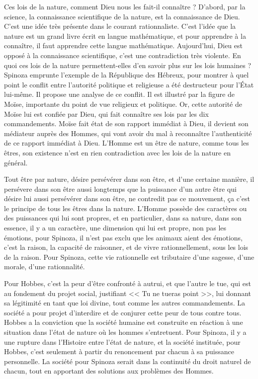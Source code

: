 \documentclass[11pt]{article}
\begin{document}
Ces lois de la nature, comment Dieu nous les fait-il connaître ? D'abord, par la science, la connaissance scientifique de la nature, est la connaissance de Dieu. C'est une idée très présente dans le courant rationnaliste. C'est l'idée que la nature est un grand livre écrit en langue mathématique, et pour apprendre à la connaître, il faut apprendre cette langue mathématique. Aujourd'hui, Dieu est opposé à la connaissance scientifique, c'est une contradiction très violente. En quoi ces lois de la nature permettent-elles d'en savoir plus sur les lois humaines ? Spinoza emprunte l'exemple de la République des Hébreux, pour montrer à quel point le conflit entre l'autorité politique et religieuse a été destructeur pour l'État lui-même. Il propose une analyse de ce conflit. Il est illustré par la figure de Moïse, importante du point de vue religieux et politique. Or, cette autorité de Moïse lui est confiée par Dieu, qui fait connaître ses lois par les dix commandements. Moïse fait état de son rapport immédiat à Dieu, il devient son médiateur auprès des Hommes, qui vont avoir du mal à reconnaître l'authenticité de ce rapport immédiat à Dieu. L'Homme est un être de nature, comme tous les êtres, son existence n'est en rien contradiction avec les lois de la nature en général. 

Tout être par nature, désire persévérer dans son être, et d'une certaine manière, il persévere dans son être aussi longtemps que la puissance d'un autre être qui désire lui aussi persévérer dans son être, ne contredit pas ce mouvement, ça c'est le principe de tous les êtres dans la nature. L'Homme possède des caractères ou des puissances qui lui sont propres, et en particulier, dans sa nature, dans son essence, il y a un caractère, une dimension qui lui est propre, non pas les émotions, pour Spinoza, il n'est pas exclu que les animaux aient des émotions, c'est la raison, la capacité de raisonner, et de vivre rationnellement, sous les lois de la raison. Pour Spinoza, cette vie rationnelle est tributaire d'une sagesse, d'une morale, d'une rationnalité. 

Pour Hobbes, c'est la peur d'être confronté à autrui, et que l'autre le tue, qui est au fondement du projet social, justifiant << Tu ne tueras point >>, lui donnant sa légitimité en tant que loi divine, tout comme les autres commandements. La société a pour projet d'interdire et de conjurer cette peur de tous contre tous. Hobbes a la conviction que la société humaine est construite en réaction à une situation dans l'état de nature où les hommes s'entretuent. Pour Spinoza, il y a une rupture dans l'Histoire entre l'état de nature, et la société instituée, pour Hobbes, c'est seulement à partir du renoncement par chacun à sa puissance personnelle. La société pour Spinoza serait dans la continuité du droit naturel de chacun, tout en apportant des solutions aux problèmes des Hommes.
\end{document}
